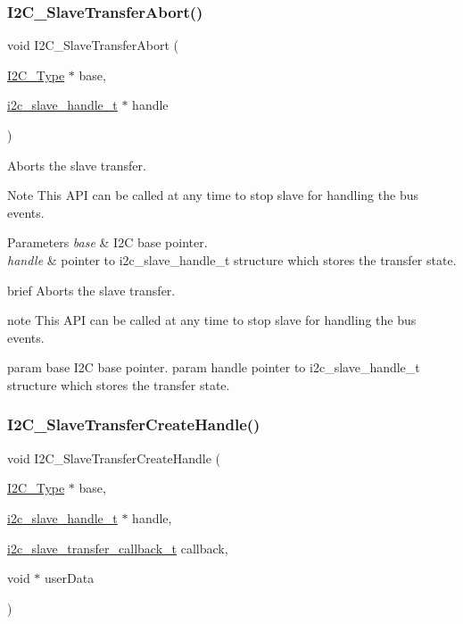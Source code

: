 \subsubsection{\texorpdfstring{I2C\_SlaveTransferAbort()}{I2C\_SlaveTransferAbort()}}
{\footnotesize\ttfamily void I2\+C\+\_\+\+Slave\+Transfer\+Abort (\begin{DoxyParamCaption}\item[{\mbox{\hyperlink{struct_i2_c___type}{I2\+C\+\_\+\+Type}} $\ast$}]{base,  }\item[{\mbox{\hyperlink{group__i2c__driver_ga394e5278816efe62815de9d25be84752}{i2c\+\_\+slave\+\_\+handle\+\_\+t}} $\ast$}]{handle }\end{DoxyParamCaption})}



Aborts the slave transfer. 

\begin{DoxyNote}{Note}
This A\+PI can be called at any time to stop slave for handling the bus events.
\end{DoxyNote}

\begin{DoxyParams}{Parameters}
{\em base} & I2C base pointer. \\
\hline
{\em handle} & pointer to i2c\+\_\+slave\+\_\+handle\+\_\+t structure which stores the transfer state.\\
\hline
\end{DoxyParams}
brief Aborts the slave transfer.

note This A\+PI can be called at any time to stop slave for handling the bus events.

param base I2C base pointer. param handle pointer to i2c\+\_\+slave\+\_\+handle\+\_\+t structure which stores the transfer state. \mbox{\label{group__i2c__driver_gac9b90f575d92ff8ad3cc350a5c8ad1b9}} 
\subsubsection{\texorpdfstring{I2C\_SlaveTransferCreateHandle()}{I2C\_SlaveTransferCreateHandle()}}
{\footnotesize\ttfamily void I2\+C\+\_\+\+Slave\+Transfer\+Create\+Handle (\begin{DoxyParamCaption}\item[{\mbox{\hyperlink{struct_i2_c___type}{I2\+C\+\_\+\+Type}} $\ast$}]{base,  }\item[{\mbox{\hyperlink{group__i2c__driver_ga394e5278816efe62815de9d25be84752}{i2c\+\_\+slave\+\_\+handle\+\_\+t}} $\ast$}]{handle,  }\item[{\mbox{\hyperlink{group__i2c__driver_ga2583e3d8ebf8d3de410d8b6263238c35}{i2c\+\_\+slave\+\_\+transfer\+\_\+callback\+\_\+t}}}]{callback,  }\item[{void $\ast$}]{user\+Data }\end{DoxyParamCaption})}



